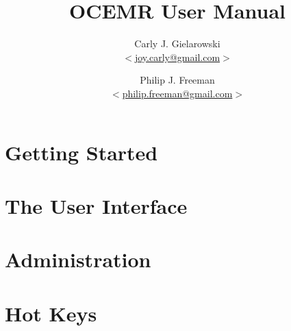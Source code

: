 \documentclass[dvipdfm]{book}
\title{OCEMR User Manual}
\author{
    Carly J. Gielarowski\\
    $<$\href{mailto:joy.carly@gmail.com}{joy.carly@gmail.com}$>$
  \and
    Philip J. Freeman\\
    $<$\href{mailto:philip.freeman@gmail.com}{philip.freeman@gmail.com}$>$
}
\date{}
\begin{document}
\maketitle
\tableofcontents
\chapter{Getting Started}

\chapter{The User Interface}

\chapter{Administration}

\appendix
\chapter{Hot Keys}

\end{document}
